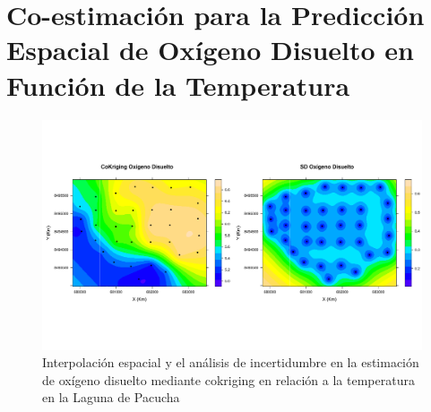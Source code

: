 \section{Co-estimación para la Predicción Espacial de Oxígeno Disuelto en Función de la Temperatura}

\begin{figure}
    \centering
    \includegraphics[width=1\linewidth]{Figuras_AED//ESTIMACION/COKRIGING_OD_TEM.pdf}
    \caption{Interpolación espacial y el análisis de incertidumbre en la estimación de oxígeno disuelto mediante cokriging en relación a la temperatura en la Laguna de Pacucha}
    \label{fig:enter-cokrigong}
\end{figure}


